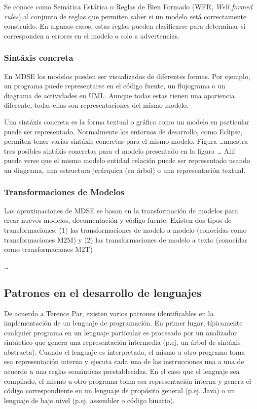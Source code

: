 Se conoce como Semática Estática o Reglas de Bien Formado (WFR, \textit{Well formed rules}) al conjunto de reglas que permiten saber si un modelo está correctamente construido.
En algunos casos, estas reglas pueden clasificarse para determinar si corresponden a errores en el modelo o solo a advertencias. 


\subsubsection{Sintáxis concreta}

En MDSE los modelos pueden ser visualizados de diferentes formas.
Por ejemplo, un programa puede representarse en el código fuente, un flujograma o un diagrama de actividades en UML.
Aunque todas estas tienen una apariencia diferente, todas ellas son representaciones del mismo modelo.

Una sintáxis concreta es la forma textual o gráfica como un modelo en particular puede ser representado.
Normalmente los entornos de desarrollo, como Eclipse, permiten tener varias sintáxis concretas para el mismo modelo.
Figura \ldots muestra tres posibles sintáxis concretas para el modelo presentado en la figura \ldots
Allí puede verse que el mismo modelo entidad relación puede ser representado usando un diagrama, una estructura jerárquica (en árbol) o una representación textual.


\subsubsection{Transformaciones de Modelos}

Las aproximaciones de MDSE se basan en la transformación de modelos para crear nuevos modelos, documentación y código fuente.
Existen dos tipos de transformaciones: 
(1) las transformaciones de modelo a modelo (conocidas como transformaciones M2M) 
y (2) las transformaciones de modelo a texto (conocidas como transformaciones M2T)

\ldots



\subsection{Patrones en el desarrollo de lenguajes}

De acuerdo a Terence Par, existen varios patrones identificables en la implementación de un lenguaje de programación.
En primer lugar, típicamente cualquier programa en un lenguaje particular es procesado por un analizador sintáctico que genera una representación intermedia (p.ej. un árbol de sintáxis abstracta).
Cuando el lenguaje es interpretado, el mismo u otro programa toma esa representación interna y ejecuta cada una de las instrucciones una a una de acuerdo a una reglas semánticas prestablecidas.
En el caso que el lenguaje sea compilado, el mismo u otro programa toma esa representación interna y genera el código correspondiente en un lenguaje de propósito general (p.ej. Java) o un lenguaje de bajo nivel (p.ej. assembler o código binario). 
 
